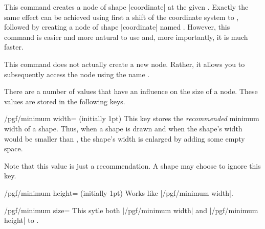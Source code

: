 \begin{command}{\pgfcoordinate{}}
  This command creates a node of shape |coordinate| at the given
  . Exactly the same effect can be achieved using
  first a shift of the coordinate system to ,
  followed by creating a node of shape |coordinate| named
  . However, this command is easier and more natural to use
  and, more importantly, it is much faster. 
\end{command}

\begin{command}{\pgfnodealias{}}
  This command does not actually create a new node. Rather, it allows
  you to subsequently access the node  using the
  name .
\end{command}



There are a number of values that have an influence on the size of a
node. These values are stored in the following keys.

\begin{key}{/pgf/minimum width= (initially 1pt)}
  This key stores the \emph{recommended} minimum width of a
  shape. Thus, when a shape is drawn and when the shape's width would
  be smaller than , the shape's width is enlarged by
  adding some empty space. 

  Note that this value is just a recommendation. A shape may choose to
  ignore this key.
  
\begin{codeexample}[]
\end{codeexample}
\end{key}

\begin{key}{/pgf/minimum height= (initially 1pt)}
  Works like |/pgf/minimum width|.
\end{key}

\begin{key}{/pgf/minimum size=}
  This sytle both |/pgf/minimum width| and |/pgf/minimum height| to .
\end{key}


